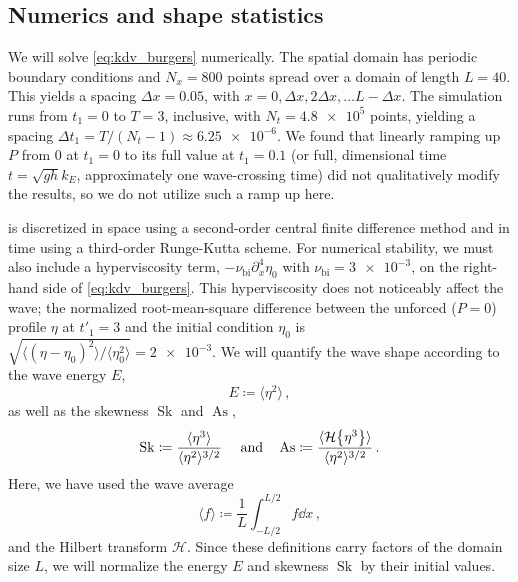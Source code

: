 \documentclass{jfm}
\DeclareMathOperator{\Sk}{Sk}
\DeclareMathOperator{\As}{As}
\newcommand{\hilbert}{\mathcal{H}}
\begin{document}
\subsection{Numerics and shape statistics}
We will solve \cref{eq:kdv_burgers} numerically.
The spatial domain has periodic boundary conditions and $N_x = 800$
points spread over a domain of length $L = 40$.
This yields a spacing $\Delta x = 0.05$, with $x = 0, \Delta x,
2\Delta x, \ldots L - \Delta x$.
The simulation runs from $t_1 = 0$ to $T = 3$, inclusive, with
$N_t = \num{4.8e5}$ points, yielding a spacing $\Delta t_1 = T/(N_t-1)
\approx \num{6.25e-6}$.
We found that linearly ramping up $P$ from $0$ at $t_1=0$ to its full
value at $t_1 = 0.1$ (or full, dimensional time $t = \sqrt{gh} k_E$,
\ie{} approximately one wave-crossing time) did not qualitatively modify
the results, so we do not utilize such a ramp up here.

 is discretized in space using a
second-order central finite difference method and in time using a
third-order Runge-Kutta scheme.
For numerical stability, we must also include a hyperviscosity term,
$-\nu_{\text{bi}} \partial_x^4 \eta_0$ with $\nu_{\text{bi}} =
\num{3e-3}$, on the right-hand side of \cref{eq:kdv_burgers}.
This hyperviscosity does not noticeably affect the wave; the normalized
root-mean-square difference between the unforced ($P=0$) profile $\eta$
at $t'_1=3$ and the initial condition $\eta_0$ is $\sqrt{\langle (\eta -
\eta_0)^2 \rangle/ \langle \eta_0^2 \rangle} = \num{2e-3}$.
We will quantify the wave shape according to the wave energy $E$,
\begin{equation}
  E \coloneqq \langle \eta^2 \rangle \,,
  \label{eq:energy_def}
\end{equation}
as well as the skewness $\Sk$ and $\As$,
\begin{equation}
  \Sk \coloneqq \frac{\langle \eta^3 \rangle}{\langle \eta^2
  \rangle^{3/2}} \
  \qq{and}
  \As \coloneqq \frac{\langle \hilbert \Bqty{\eta^3} \rangle}{\langle
    \eta^2 \rangle^{3/2}} \,.
  \label{eq:shape_stats_def}
\end{equation}
Here, we have used the wave average
\begin{equation}
  \langle f \rangle \coloneqq \frac{1}{L} \int_{-L/2}^{L/2} f
  \dd{x} \,,
\end{equation}
and the Hilbert transform $\hilbert$.
Since these definitions carry factors of the domain size $L$, we will
normalize the energy $E$ and skewness $\Sk$ by their initial values.
\end{document}
